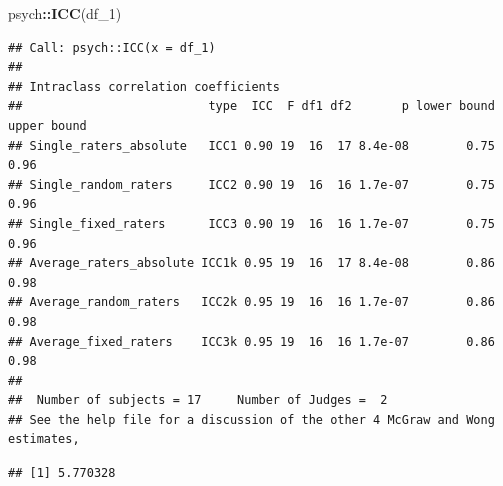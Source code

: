 \documentclass[
]{article}
\newenvironment{Shaded}{\begin{snugshade}}{\end{snugshade}}
\newcommand{\AttributeTok}[1]{\textcolor[rgb]{0.13,0.29,0.53}{#1}}
\newcommand{\CommentTok}[1]{\textcolor[rgb]{0.56,0.35,0.01}{\textit{#1}}}
\newcommand{\ConstantTok}[1]{\textcolor[rgb]{0.56,0.35,0.01}{#1}}
\newcommand{\DecValTok}[1]{\textcolor[rgb]{0.00,0.00,0.81}{#1}}
\newcommand{\FunctionTok}[1]{\textcolor[rgb]{0.13,0.29,0.53}{\textbf{#1}}}
\newcommand{\NormalTok}[1]{#1}
\newcommand{\SpecialCharTok}[1]{\textcolor[rgb]{0.81,0.36,0.00}{\textbf{#1}}}
\begin{document}
\begin{Shaded}
\begin{Highlighting}[]
\NormalTok{psych}\SpecialCharTok{::}\FunctionTok{ICC}\NormalTok{(df\_1)}
\end{Highlighting}
\end{Shaded}

\begin{verbatim}
## Call: psych::ICC(x = df_1)
## 
## Intraclass correlation coefficients 
##                          type  ICC  F df1 df2       p lower bound upper bound
## Single_raters_absolute   ICC1 0.90 19  16  17 8.4e-08        0.75        0.96
## Single_random_raters     ICC2 0.90 19  16  16 1.7e-07        0.75        0.96
## Single_fixed_raters      ICC3 0.90 19  16  16 1.7e-07        0.75        0.96
## Average_raters_absolute ICC1k 0.95 19  16  17 8.4e-08        0.86        0.98
## Average_random_raters   ICC2k 0.95 19  16  16 1.7e-07        0.86        0.98
## Average_fixed_raters    ICC3k 0.95 19  16  16 1.7e-07        0.86        0.98
## 
##  Number of subjects = 17     Number of Judges =  2
## See the help file for a discussion of the other 4 McGraw and Wong estimates,
\end{verbatim}

\begin{Shaded}
\end{Shaded}

\begin{verbatim}
## [1] 5.770328
\end{verbatim}
\end{document}
